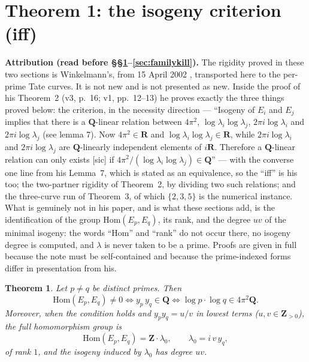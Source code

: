 \documentclass[11pt]{article}
\newtheorem{theorem}{Theorem}
\theoremstyle{definition}
\theoremstyle{remark}
\newcommand{\Z}{\mathbf{Z}}
\newcommand{\Q}{\mathbf{Q}}
\newcommand{\R}{\mathbf{R}}
\newcommand{\Hom}{\mathrm{Hom}}
\begin{document}
\section{Theorem 1: the isogeny criterion (iff)}
\label{sec:isogeny}

\noindent\textbf{Attribution (read before \S\S\ref{sec:isogeny}--\ref{sec:familykill}).}
The rigidity proved in these two sections is Winkelmann's, from 15 April 2002
\cite{Wi04}, transported here to the per-prime Tate curves. It is not new and is
not presented as new. Inside the proof of his Theorem~2 (v3, p.~16; v1,
pp.~12--13) he proves exactly the three things proved below: the criterion, in
the necessity direction --- ``Isogeny of $E_i$ and $E_j$ implies that there is a
$\Q$-linear relation between $4\pi^2$, $\log\lambda_i \log\lambda_j$,
$2\pi i \log\lambda_i$ and $2\pi i \log\lambda_j$ (see lemma 7). Now
$4\pi^2 \in \R$ and $\log\lambda_i \log\lambda_j \in \R$, while
$2\pi i \log\lambda_i$ and $2\pi i \log\lambda_j$ are $\Q$-linearly
independent elements of $i\R$. Therefore a $\Q$-linear relation can only exists
[sic] if $4\pi^2/(\log\lambda_i \log\lambda_j) \in \Q$'' --- with the converse
one line from his Lemma~7, which is stated as an equivalence, so the ``iff'' is
his too; the two-partner rigidity of Theorem~2, by dividing two such relations;
and the three-curve run of Theorem~3, of which $\{2,3,5\}$ is the numerical
instance. What is genuinely not in his paper, and is what these sections add, is
the identification of the group $\Hom(E_p, E_q)$, its rank, and the degree $uv$
of the minimal isogeny: the words ``Hom'' and ``rank'' do not occur there, no
isogeny degree is computed, and $\lambda$ is never taken to be a prime. Proofs
are given in full because the note must be self-contained and because the
prime-indexed forms differ in presentation from his.

\begin{theorem}
\label{thm:isogeny}
Let $p \neq q$ be distinct primes. Then
\[
\Hom(E_p, E_q) \neq 0
\iff y_p\, y_q \in \Q
\iff \log p \cdot \log q \in 4\pi^2\Q .
\]
Moreover, when the condition holds and $y_p y_q = u/v$ in lowest terms
($u, v \in \Z_{>0}$), the full homomorphism group is
\[
\Hom(E_p, E_q) = \Z\cdot\lambda_0 , \qquad \lambda_0 = i\, v\, y_q ,
\]
of rank $1$, and the isogeny induced by $\lambda_0$ has degree $uv$.
\end{theorem}
\end{document}
